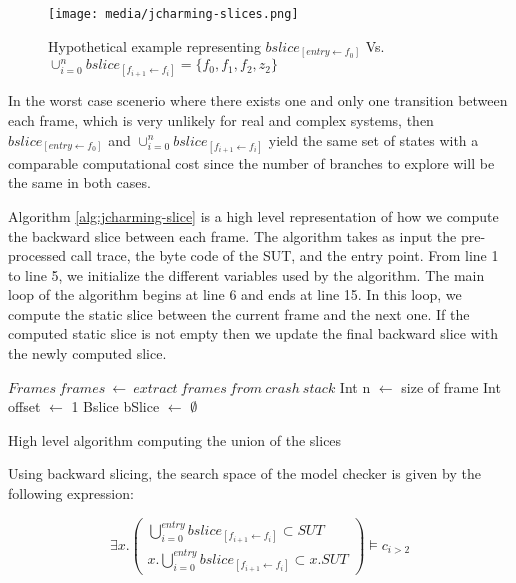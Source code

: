 \begin{figure}[h!]
  \centering
    \texttt{[image: media/jcharming-slices.png]}
    \caption{Hypothetical example representing $bslice_{[entry \leftarrow f_0]}$ Vs. $\cup_{i=0}^n bslice_{[f_{i+1} \leftarrow f_i]} = \{f_0 , f_1 , f_2 , z_2 \}$
    \label{fig:jcharming-slice}}
\end{figure}

In the worst case scenerio where there exists one and only one
transition between each frame, which is very unlikely for real
and complex systems, then $bslice_{[entry \leftarrow f_0]}$ and
 $\cup_{i=0}^n bslice_{[f_{i+1} \leftarrow f_i]}$ yield the same set of states with a
comparable computational cost since the number of branches
to explore will be the same in both cases.

Algorithm \ref{alg:jcharming-slice} is a high level
representation of how we compute the backward slice between
each frame. The algorithm takes as input the pre-processed
call trace, the byte code of the SUT, and the entry point. From
line 1 to line 5, we initialize the different variables used by the
algorithm. The main loop of the algorithm begins at line 6 and
ends at line 15. In this loop, we compute the static slice
between the current frame and the next one. If the computed
static slice is not empty then we update the final backward
slice with the newly computed slice.


\begin{algorithm}[H]
 $Frames~frames~\leftarrow~extract~frames~from~crash~stack$\;
 Int n $\leftarrow$ size of frame\;
 Int offset $\leftarrow$ 1\;
 Bslice bSlice $\leftarrow$ $\emptyset$\;
\caption{High level algorithm computing the union of the slices\label{alg:jcharming-slice}}
\end{algorithm}

Using backward slicing, the search space of the model checker is given by the
following expression:

\begin{equation}
  \exists x.
  \begin{pmatrix}
    \bigcup_{i=0}^{entry} bslice_{[f_{i+1} \leftarrow f_i]}  \subset SUT \\
    x.\bigcup_{i=0}^{entry} bslice_{[f_{i+1} \leftarrow f_i]}  \subset x.SUT
  \end{pmatrix}
  \models c_{i>2}
\end{equation}

